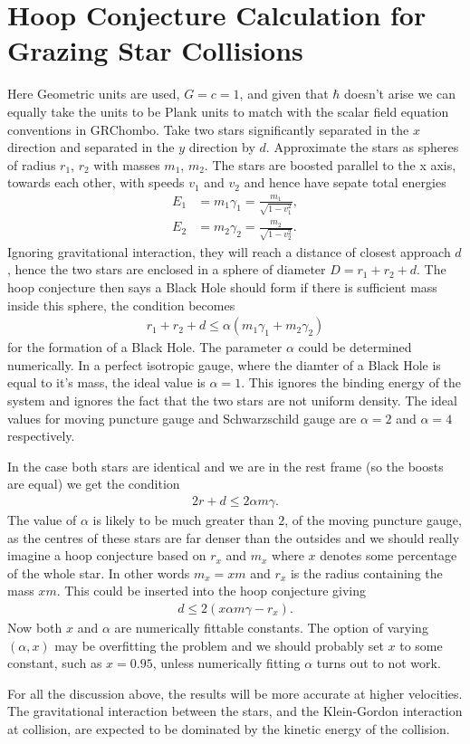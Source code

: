
 \section*{Hoop Conjecture Calculation for Grazing Star Collisions}

Here Geometric units are used, $G=c=1$, and given that $\hbar$ doesn't arise we can equally take the units to be Plank units to match with the scalar field equation conventions in GRChombo. Take two stars significantly separated in the $x$ direction and separated in the $y$ direction by $d$. Approximate the stars as spheres of radius $r_1$, $r_2$ with masses $m_1$, $m_2$. The stars are boosted parallel to the x axis, towards each other, with speeds $v_1$ and $v_2$ and hence have sepate total energies 
\begin{align}
E_1 &= m_1 \gamma_1 = \frac{m_1 }{\sqrt{1-v_1^2}}, \\
E_2 &= m_2 \gamma_2 = \frac{m_2 }{\sqrt{1-v_2^2}}.
\end{align}
Ignoring gravitational interaction, they will reach a distance of closest approach $d$, hence the two stars are enclosed in a sphere of diameter $D = r_1 + r_2 + d$. The hoop conjecture then says a Black Hole should form if there is sufficient mass inside this sphere, the condition becomes
\begin{align}
r_1 + r_2 + d \leq \alpha \left( m_1 \gamma_1 + m_2 \gamma_2\right)
\end{align}
for the formation of a Black Hole. The parameter $\alpha$ could be determined numerically. In a perfect isotropic gauge, where the diamter of a Black Hole is equal to it's mass, the ideal value is $\alpha = 1$. This ignores the binding energy of the system and ignores the fact that the two stars are not uniform density. The ideal values for moving puncture gauge and Schwarzschild gauge are $\alpha = 2$ and $\alpha = 4$ respectively.

In the case both stars are identical and we are in the rest frame (so the boosts are equal) we get the condition
\begin{align}
2r + d \leq 2 \alpha m \gamma. 
\end{align}
The value of $\alpha$ is likely to be much greater than $2$, of the moving puncture gauge, as the centres of these stars are far denser than the outsides and we should really imagine a hoop conjecture based on $r_x$ and $m_x$ where $x$ denotes some percentage of the whole star. In other words $m_x = xm$ and $r_x$ is the radius containing the mass $xm$. This could be inserted into the hoop conjecture giving 
\begin{align}
 d \leq 2  (x \alpha m \gamma - r_x). 
\end{align}
Now both $x$ and $\alpha$ are numerically fittable constants. The option of varying $(\alpha,x)$ may be overfitting the problem and we should probably set $x$ to some constant, such as $x=0.95$, unless numerically fitting $\alpha$ turns out to not work.

For all the discussion above, the results will be more accurate at higher velocities. The gravitational interaction between the stars, and the Klein-Gordon interaction at collision, are expected to be dominated by the kinetic energy of the collision.
